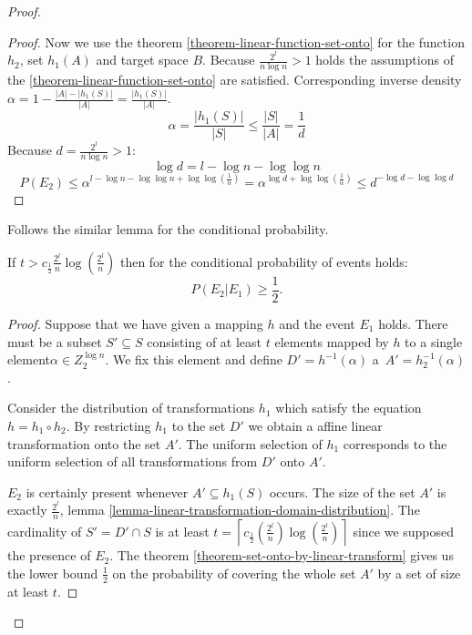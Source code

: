 \begin{proof}
\begin{proof}
Now we use the theorem \ref{theorem-linear-function-set-onto} for the function $h_2$, set $h_1(A)$ and target space $B$. Because $\frac{2^l}{n \log n} > 1$ holds the assumptions of the \ref{theorem-linear-function-set-onto} are satisfied. Corresponding inverse density $\alpha = 1 - \frac{|A| - |h_1(S)|}{|A|} = \frac{|h_1(S)|}{|A|}$.
\begin{displaymath}
\alpha = \frac{|h_1(S)|}{|S|} \leq \frac{|S|}{|A|} = \frac{1}{d}
\end{displaymath}
Because $d = \frac{2^l}{n \log n} > 1$:
\begin{displaymath}
\log d = l - \log n - \log \log n
\end{displaymath}
\begin{displaymath}
P(E_2) \leq \alpha^{l - \log n - \log \log n + \log \log \left(\frac{1}{\alpha}\right)} = \alpha ^ {\log d + \log \log \left(\frac{1}{\alpha}\right)} \leq d^{-\log d - \log \log d}
\end{displaymath}
\end{proof}

Follows the similar lemma for the conditional probability.
\begin{remark}
\label{remark-prob-t-length-chain}
If $t > c_{\frac{1}{2}}{\frac{2^l}{n}}\log\left(\frac{2^l}{n}\right)$ then for the conditional probability of events holds:
\begin{displaymath}
P(E_2 | E_1) \geq \frac{1}{2} \textit{.}
\end{displaymath}
\end{remark}
\begin{proof}
Suppose that we have given a mapping $h$ and the event $E_1$ holds. There must be a subset $S' \subseteq S$ consisting of at least $t$ elements mapped by $h$ to a single element$\alpha \in Z_2^{\log n}$. We fix this element and define $D' = h^{-1}(\alpha)$ a~$A' = h_2^{-1}(\alpha)$. 

Consider the distribution of transformations $h_1$ which satisfy the equation $h = h_1 \circ h_2$. By restricting $h_1$ to the set $D'$ we obtain a affine linear transformation onto the set $A'$. The uniform selection of $h_1$ corresponds to the uniform selection of all transformations from $D'$ onto $A'$.

$E_2$ is certainly present whenever $A' \subseteq h_1(S)$ occurs. The size of the set $A'$ is exactly $\frac{2^l}{n}$, lemma \ref{lemma-linear-transformation-domain-distribution}. The cardinality of  $S' = D' \cap S$ is at least $t = \left\lceil c_{\frac{1}{2}}\left(\frac{2^l}{n}\right)\log\left(\frac{2^l}{n}\right)\right\rceil$ since we supposed the presence of $E_2$. The theorem \ref{theorem-set-onto-by-linear-transform} gives us the lower bound $\frac{1}{2}$ on the probability of covering the whole set $A'$ by a set of size at least $t$. 
\end{proof}


\end{proof}
